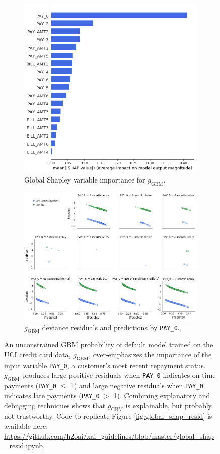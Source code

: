 \documentclass[sigconf]{acmart}
\begin{document}
\begin{figure}[htb!]
	\begin{subfigure}{.4\textwidth} \centering
  		\includegraphics[height=0.8\linewidth, width=0.75\linewidth]{img/global_shap.png}
  		\caption{Global Shapley variable importance for $g_{\text{GBM}}$.}
  		\label{fig:global_shap}
	\end{subfigure}
	\begin{subfigure}{.5\textwidth} \centering
		\vspace{5pt}\includegraphics[width=0.85\linewidth]{img/resid.png}
  		\caption{$g_{\text{GBM}}$ deviance residuals and predictions by \texttt{PAY\_0}.}
  		\label{fig:resid}
	\end{subfigure}
	\vspace{-8pt}
	\caption{An unconstrained GBM probability of default model trained on the UCI credit card data\cite{uci}, $g_{\text{GBM}}$, over-emphasizes the importance of the input variable \texttt{PAY\_0}, a customer's most recent repayment status. $g_{\text{GBM}}$ produces large positive residuals when \texttt{PAY\_0} indicates on-time payments (\texttt{PAY\_0} $\leq$ 1) and large negative residuals when \texttt{PAY\_0} indicates late payments (\texttt{PAY\_0} $>$ 1). Combining explanatory and debugging techniques shows that $g_{\text{GBM}}$ is explainable, but probably not trustworthy. Code to replicate Figure \ref{fig:global_shap_resid} is available here: \url{https://github.com/h2oai/xai_guidelines/blob/master/global_shap_resid.ipynb}.} 

\end{figure}
\end{document}
